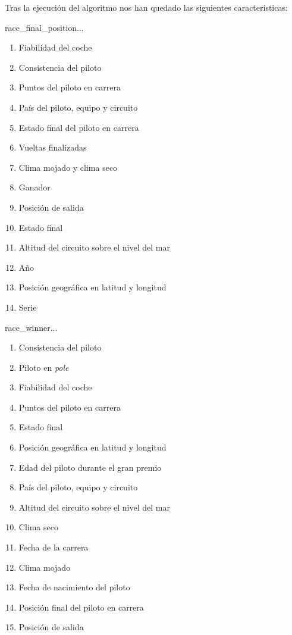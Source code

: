 Tras la ejecución del algoritmo nos han quedado las siguientes características:

race\_final\_position...
\begin{enumerate}
    \item Fiabilidad del coche
    \item Consistencia del piloto
    \item Puntos del piloto en carrera
    \item País del piloto, equipo y circuito
    \item Estado final del piloto en carrera
    \item Vueltas finalizadas
    \item Clima mojado y clima seco
    \item Ganador
    \item Posición de salida
    \item Estado final
    \item Altitud del circuito sobre el nivel del mar
    \item Año
    \item Posición geográfica en latitud y longitud
    \item Serie
\end{enumerate}

race\_winner...
\begin{enumerate}
    \item Consistencia del piloto
    \item Piloto en \textit{pole}
    \item Fiabilidad del coche
    \item Puntos del piloto en carrera
    \item Estado final
    \item Posición geográfica en latitud y longitud
    \item Edad del piloto durante el gran premio
    \item País del piloto, equipo y circuito
    \item Altitud del circuito sobre el nivel del mar
    \item Clima seco
    \item Fecha de la carrera
    \item Clima mojado
    \item Fecha de nacimiento del piloto
    \item Posición final del piloto en carrera
    \item Posición de salida
\end{enumerate}

